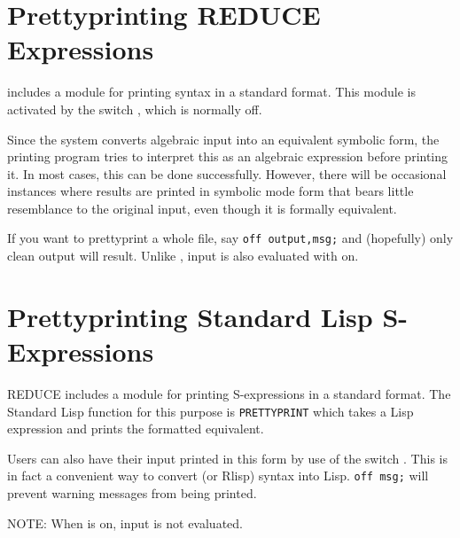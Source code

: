 \section{Prettyprinting REDUCE Expressions}
\hypertarget{switch:PRET}{}

{\REDUCE} includes a module for printing {\REDUCE} syntax in a standard
format.  This module is activated by the switch ,
 which is normally off.

Since the system converts algebraic input into an equivalent symbolic form,
the printing program tries to interpret this as an algebraic expression
before printing it. In most cases, this can be done successfully. However,
there will be occasional instances where results are printed in symbolic
mode form that bears little resemblance to the original input, even though
it is formally equivalent.

\hypertarget{switch:MSG}{}
If you want to prettyprint a whole file, say \texttt{off output,msg;}
 and (hopefully) only clean output will result.  Unlike 
, input is also evaluated with 
 on.

\section{Prettyprinting Standard Lisp S-Expressions}

REDUCE includes a module for printing
S-expressions in a standard format.  The Standard Lisp function for this
purpose is \texttt{PRETTYPRINT} which takes a Lisp
expression and prints the formatted equivalent.

Users can also have their {\REDUCE} input printed in this form by use of
the switch . This is in fact a convenient way to
convert {\REDUCE} (or Rlisp) syntax into Lisp. \texttt{off msg;} will prevent
warning messages from being printed.

NOTE: When  is on, input is not evaluated.

